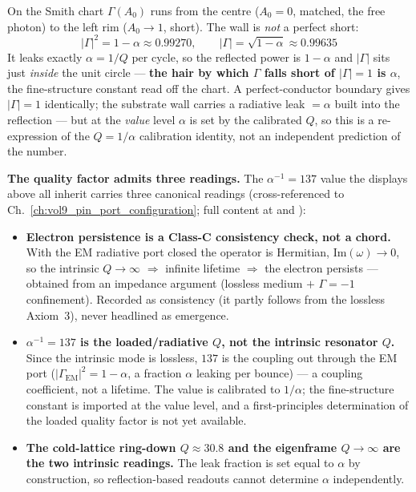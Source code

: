 On the Smith chart $\Gamma(A_0)$ runs from the centre ($A_0=0$, matched, the free photon) to the left rim ($A_0\to1$, short). The wall is \emph{not} a perfect short:
\begin{equation}
\boxed{\; |\Gamma|^2 = 1 - \alpha \approx 0.99270, \qquad |\Gamma| = \sqrt{1-\alpha} \approx 0.99635 \;}
\end{equation}
It leaks exactly $\alpha = 1/Q$ per cycle, so the reflected power is $1-\alpha$ and $|\Gamma|$ sits just \emph{inside} the unit circle --- \textbf{the hair by which $\Gamma$ falls short of $|\Gamma|=1$\gammaundeclared{} is $\alpha$}, the fine-structure constant read off the chart. A perfect-conductor boundary gives $|\Gamma|=1$\gammaundeclared{} identically; the substrate wall carries a radiative leak $=\alpha$ built into the reflection --- but at the \emph{value} level $\alpha$ is set by the calibrated $Q$, so this is a re-expression of the $Q=1/\alpha$ calibration identity, not an independent prediction of the number.

\medskip\noindent
\textbf{The quality factor admits three readings.} The $\alpha^{-1} = 137$ value the displays above all inherit carries three canonical readings (cross-referenced to Ch.~\ref{ch:vol9_pin_port_configuration}; full content at  and ):
\begin{itemize}
  \item \textbf{Electron persistence is a Class-C consistency check, not a chord.} With the EM radiative port closed the operator is Hermitian, $\mathrm{Im}(\omega)\to0$, so the intrinsic $Q\to\infty$ $\Rightarrow$ infinite lifetime $\Rightarrow$ the electron persists --- obtained from an impedance argument (lossless medium $+$ $\Gamma=-1$\gammaundeclared{} confinement). Recorded as consistency (it partly follows from the lossless Axiom~3), never headlined as emergence.
  \item \textbf{$\alpha^{-1}=137$ is the loaded/radiative $Q$, not the intrinsic resonator $Q$.} Since the intrinsic mode is lossless, $137$ is the coupling out through the EM port ($|\Gamma_{\mathrm{EM}}|^2=1-\alpha$, a fraction $\alpha$ leaking per bounce) --- a coupling coefficient, not a lifetime. The value is calibrated to $1/\alpha$; the fine-structure constant is imported at the value level, and a first-principles determination of the loaded quality factor is not yet available.
  \item \textbf{The cold-lattice ring-down $Q\approx30.8$ and the eigenframe $Q\to\infty$ are the two intrinsic readings.} The leak fraction is set equal to $\alpha$ by construction, so reflection-based readouts cannot determine $\alpha$ independently.
\end{itemize}

